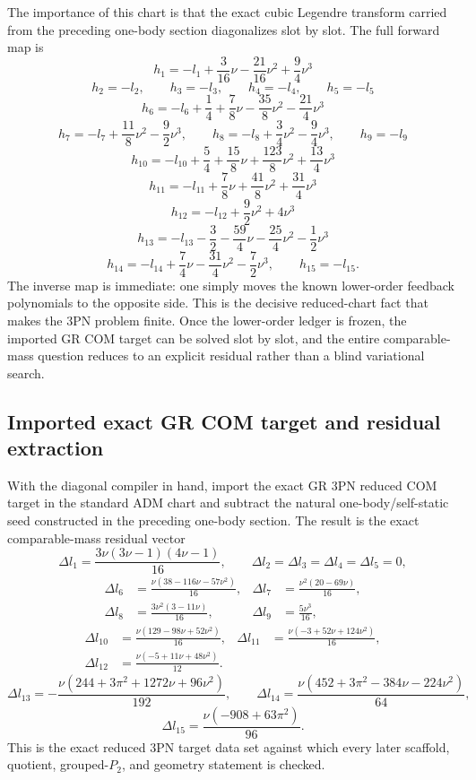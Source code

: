 \documentclass[11pt]{article}
\begin{document}
The importance of this chart is that the exact cubic Legendre transform carried from the preceding one-body section diagonalizes slot by slot.  The full
forward map is
\[
\boxed{h_1=-l_1+\frac{3}{16}\nu-\frac{21}{16}\nu^2+\frac94\nu^3}
\]
\[
\boxed{h_2=-l_2,
\qquad h_3=-l_3,
\qquad h_4=-l_4,
\qquad h_5=-l_5}
\]
\[
\boxed{h_6=-l_6+\frac14+\frac78\nu-\frac{35}{8}\nu^2-\frac{21}{4}\nu^3}
\]
\[
\boxed{h_7=-l_7+\frac{11}{8}\nu^2-\frac92\nu^3,
\qquad
h_8=-l_8+\frac34\nu^2-\frac94\nu^3,
\qquad
h_9=-l_9}
\]
\[
\boxed{h_{10}=-l_{10}+\frac54+\frac{15}{8}\nu+\frac{123}{8}\nu^2+\frac{13}{4}\nu^3}
\]
\[
\boxed{h_{11}=-l_{11}+\frac78\nu+\frac{41}{8}\nu^2+\frac{31}{4}\nu^3}
\]
\[
\boxed{h_{12}=-l_{12}+\frac92\nu^2+4\nu^3}
\]
\[
\boxed{h_{13}=-l_{13}-\frac32-\frac{59}{4}\nu-\frac{25}{4}\nu^2-\frac12\nu^3}
\]
\[
\boxed{h_{14}=-l_{14}+\frac74\nu-\frac{31}{4}\nu^2-\frac72\nu^3,
\qquad
h_{15}=-l_{15}.}
\]
The inverse map is immediate: one simply moves the known lower-order feedback
polynomials to the opposite side.  This is the decisive reduced-chart fact that
makes the $3$PN problem finite.  Once the lower-order ledger is frozen, the
imported GR COM target can be solved slot by slot, and the entire comparable-mass
question reduces to an explicit residual rather than a blind variational search.

\subsection{Imported exact GR COM target and residual extraction}
\label{sec:compmass-com-target}

With the diagonal compiler in hand, import the exact GR $3$PN reduced COM target
in the standard ADM chart and subtract the natural one-body/self-static seed
constructed in the preceding one-body section.  The result is the exact comparable-mass
residual vector
\[
\Delta l_1=\frac{3\nu(3\nu-1)(4\nu-1)}{16},
\qquad
\Delta l_2=\Delta l_3=\Delta l_4=\Delta l_5=0,
\]
\[
\begin{aligned}
\Delta l_6&=\frac{\nu(38-116\nu-57\nu^2)}{16},
& \Delta l_7&=\frac{\nu^2(20-69\nu)}{16},
\\
\Delta l_8&=\frac{3\nu^2(3-11\nu)}{16},
& \Delta l_9&=\frac{5\nu^3}{16},
\end{aligned}
\]
\[
\begin{aligned}
\Delta l_{10}&=\frac{\nu(129-98\nu+52\nu^2)}{16},
& \Delta l_{11}&=\frac{\nu(-3+52\nu+124\nu^2)}{16},
\\
\Delta l_{12}&=\frac{\nu(-5+11\nu+48\nu^2)}{12}.
\end{aligned}
\]
\[
\Delta l_{13}=-\frac{\nu(244+3\pi^2+1272\nu+96\nu^2)}{192},
\qquad
\Delta l_{14}=\frac{\nu(452+3\pi^2-384\nu-224\nu^2)}{64},
\]
\[
\Delta l_{15}=\frac{\nu(-908+63\pi^2)}{96}.
\]
This is the exact reduced $3$PN target data set against which every later
scaffold, quotient, grouped-$P_2$, and geometry statement is checked.
\end{document}
